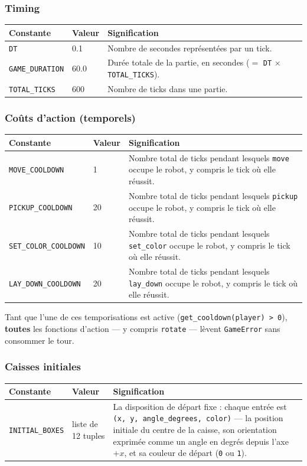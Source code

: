 \documentclass[11pt,a4paper]{article}
\newcommand{\code}[1]{\texttt{#1}}
\newcommand{\func}[1]{\texttt{#1}}
\begin{document}
\subsubsection*{Timing}
\begin{longtable}{p{4.7cm}p{2cm}p{8cm}}
\toprule
\textbf{Constante} & \textbf{Valeur} & \textbf{Signification} \\
\midrule
\endhead
\code{DT} & 0.1 & Nombre de secondes représentées par un tick. \\
\code{GAME\_DURATION} & 60.0 & Durée totale de la partie, en
    secondes ($=$ \code{DT} $\times$ \code{TOTAL\_TICKS}). \\
\code{TOTAL\_TICKS} & 600 & Nombre de ticks dans une partie. \\
\bottomrule
\end{longtable}

\subsubsection*{Coûts d'action (temporels)}
\begin{longtable}{p{4.7cm}p{2cm}p{8cm}}
\toprule
\textbf{Constante} & \textbf{Valeur} & \textbf{Signification} \\
\midrule
\endhead
\code{MOVE\_COOLDOWN} & 1 & Nombre total de ticks pendant lesquels
    \func{move} occupe le robot, y compris le tick où elle réussit. \\
\code{PICKUP\_COOLDOWN} & 20 & Nombre total de ticks pendant lesquels
    \func{pickup} occupe le robot, y compris le tick où elle réussit. \\
\code{SET\_COLOR\_COOLDOWN} & 10 & Nombre total de ticks pendant
    lesquels \func{set\_color} occupe le robot, y compris le tick où elle
    réussit. \\
\code{LAY\_DOWN\_COOLDOWN} & 20 & Nombre total de ticks pendant
    lesquels \func{lay\_down} occupe le robot, y compris le tick où elle
    réussit. \\
\bottomrule
\end{longtable}

Tant que l'une de ces temporisations est active
(\code{get\_cooldown(player) > 0}), \textbf{toutes} les fonctions d'action ---
y compris \func{rotate} --- lèvent \code{GameError} sans consommer le tour.

\subsubsection*{Caisses initiales}
\begin{longtable}{p{4.7cm}p{2cm}p{8cm}}
\toprule
\textbf{Constante} & \textbf{Valeur} & \textbf{Signification} \\
\midrule
\endhead
\code{INITIAL\_BOXES} & liste de 12 tuples & La disposition de départ
    fixe : chaque entrée est \code{(x, y, angle\_degrees, color)} --- la
    position initiale du centre de la caisse, son orientation exprimée comme
    un angle en degrés depuis l'axe $+x$, et sa couleur de départ
    (\code{0} ou \code{1}). \\
\bottomrule
\end{longtable}
\end{document}

